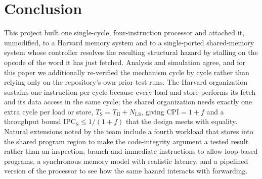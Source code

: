 \documentclass[conference]{IEEEtran}
\newcommand{\NLS}{N_{\mathrm{LS}}}
\newcommand{\Tharv}{T_{\mathrm{H}}}
\newcommand{\Tshr}{T_{\mathrm{S}}}
\begin{document}
\section{Conclusion}
\label{sec:conclusion}
This project built one single-cycle, four-instruction processor and attached it, unmodified, to a
Harvard memory system and to a single-ported shared-memory system whose controller resolves the
resulting structural hazard by stalling on the opcode of the word it has just fetched. Analysis and
simulation agree, and for this paper we additionally re-verified the mechanism cycle by cycle rather
than relying only on the repository's own prior test runs. The Harvard organization sustains one
instruction per cycle because every load and store performs its fetch and its data access in the
same cycle; the shared organization needs exactly one extra cycle per load or store,
$\Tshr = \Tharv + \NLS$, giving $\mathrm{CPI} = 1+f$ and a throughput bound
$\mathrm{IPC}_{\mathrm{S}} \le 1/(1+f)$ that the design meets with equality. Natural extensions
noted by the team include a fourth workload that stores into the shared program region to make the
code-integrity argument a tested result rather than an inspection, branch and immediate
instructions to allow loop-based programs, a synchronous memory model with realistic latency, and a
pipelined version of the processor to see how the same hazard interacts with forwarding.

\end{document}
